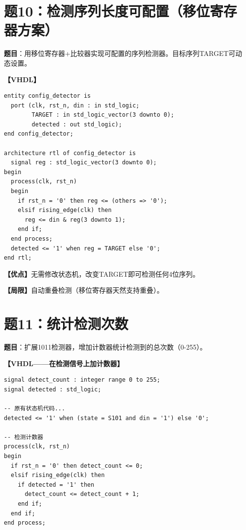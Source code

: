 \section{题10：检测序列长度可配置（移位寄存器方案）}

\textbf{题目}：用移位寄存器+比较器实现可配置的序列检测器。目标序列TARGET可动态设置。

\begin{solution}[完整解答]

\textbf{【VHDL】}
\begin{lstlisting}
entity config_detector is
  port (clk, rst_n, din : in std_logic;
        TARGET : in std_logic_vector(3 downto 0);
        detected : out std_logic);
end config_detector;

architecture rtl of config_detector is
  signal reg : std_logic_vector(3 downto 0);
begin
  process(clk, rst_n)
  begin
    if rst_n = '0' then reg <= (others => '0');
    elsif rising_edge(clk) then
      reg <= din & reg(3 downto 1);
    end if;
  end process;
  detected <= '1' when reg = TARGET else '0';
end rtl;
\end{lstlisting}

\textbf{【优点】}无需修改状态机，改变TARGET即可检测任何4位序列。

\textbf{【局限】}自动重叠检测（移位寄存器天然支持重叠）。

\end{solution}


\section{题11：统计检测次数}

\textbf{题目}：扩展1011检测器，增加计数器统计检测到的总次数（0-255）。

\begin{solution}[完整解答]

\textbf{【VHDL——在检测信号上加计数器】}
\begin{lstlisting}
signal detect_count : integer range 0 to 255;
signal detected : std_logic;

-- 原有状态机代码...
detected <= '1' when (state = S101 and din = '1') else '0';

-- 检测计数器
process(clk, rst_n)
begin
  if rst_n = '0' then detect_count <= 0;
  elsif rising_edge(clk) then
    if detected = '1' then
      detect_count <= detect_count + 1;
    end if;
  end if;
end process;
\end{lstlisting}

\end{solution}


